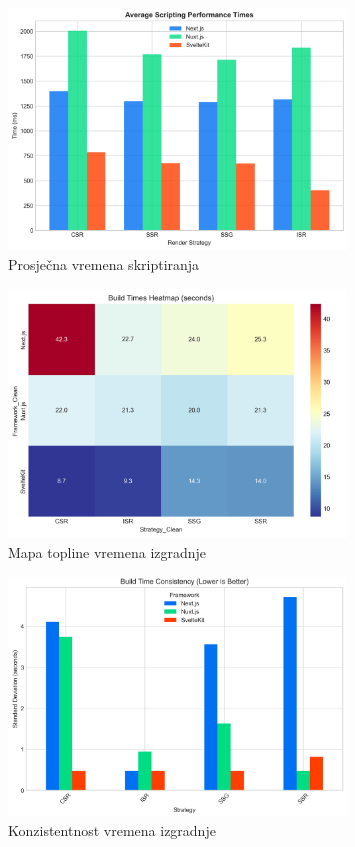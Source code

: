 \begin{figure}[H]
    \centering
    \includegraphics[width=0.8\textwidth]{slike/rezultati/dodatne-metrike/average_scripting_performance_times.png}
    \caption{Prosječna vremena skriptiranja}
    \label{fig:average_scripting_performance_times}
\end{figure}

\begin{figure}[H]
    \centering
    \includegraphics[width=0.8\textwidth]{slike/rezultati/dodatne-metrike/build_times_heat_map.png}
    \caption{Mapa topline vremena izgradnje}
    \label{fig:build_times_heat_map}
\end{figure}

\begin{figure}[H]
    \centering
    \includegraphics[width=0.8\textwidth]{slike/rezultati/dodatne-metrike/build_time_consistency.png}
    \caption{Konzistentnost vremena izgradnje}
    \label{fig:build_time_consistency}
\end{figure}


